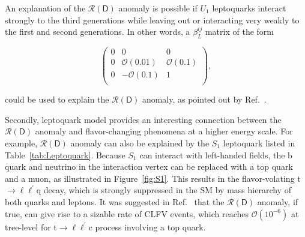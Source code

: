 An explanation of the $\mathcal{R}(\textsf{D})$ anomaly is possible if $U_{1}$ leptoquarks interact strongly to the third generations while leaving out or interacting very weakly to the first and second generations. In other words, a $\beta^{ij}_{L}$ matrix of the form

\begin{equation}
\begin{pmatrix}
0 & 0 & 0\\
0 & \mathcal{O}(0.01) & \mathcal{O}(0.1)\\
0 & -\mathcal{O}(0.1) & 1\\
\end{pmatrix},
\end{equation}

could be used to explain the $\mathcal{R}(\textsf{D})$ anomaly, as pointed out by Ref.~\cite{Cornella:2021sby}.

Secondly, leptoquark model provides an interesting connection between the $\mathcal{R}(\textsf{D})$ anomaly and flavor-changing phenomena at a higher energy scale. For example, $\mathcal{R}(\textsf{D})$ anomaly can also be explained by the $S_1$ leptoquark listed in Table~\ref{tab:Leptoquark}. Because $S_1$ can interact with left-handed fields, the b quark and neutrino in the interaction vertex can be replaced with a top quark and a muon, as illustrated in Figure~\ref{fig:S1}. This results in the flavor-volating t$\rightarrow\ell\ell^{\prime}$q decay, which is strongly suppressed in the \ac{SM} by mass hierarchy of both quarks and leptons. It was suggested in Ref.~\cite{Kim:2018oih} that the $\mathcal{R}(\textsf{D})$ anomaly, if true, can give rise to a sizable rate of \ac{CLFV} events, which reaches $\mathcal{O}(10^{-6})$ at tree-level for t$\rightarrow\ell\ell^{\prime}$c process involving a top quark.

